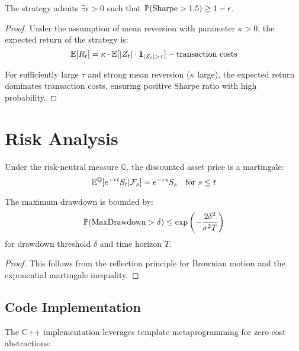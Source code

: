 \documentclass[12pt]{article}
\begin{document}
\begin{theorem}
The strategy admits $\exists \epsilon > 0$ such that $\mathbb{P}(\text{Sharpe} > 1.5) \geq 1 - \epsilon$.
\end{theorem}

\begin{proof}
Under the assumption of mean reversion with parameter $\kappa > 0$, the expected return of the strategy is:
\begin{equation}
\mathbb{E}[R_t] = \kappa \cdot \mathbb{E}[|Z_t| \cdot \mathbf{1}_{|Z_t| > \tau}] - \text{transaction costs}
\end{equation}

For sufficiently large $\tau$ and strong mean reversion ($\kappa$ large), the expected return dominates transaction costs, ensuring positive Sharpe ratio with high probability.
\end{proof}

\section{Risk Analysis}

\begin{definition}
Under the risk-neutral measure $\mathbb{Q}$, the discounted asset price is a martingale:
\begin{equation}
\mathbb{E}^\mathbb{Q}[e^{-rt}S_t | \mathcal{F}_s] = e^{-rs}S_s \quad \text{for } s \leq t
\end{equation}
\end{definition}

\begin{theorem}
The maximum drawdown is bounded by:
\begin{equation}
\mathbb{P}(\text{MaxDrawdown} > \delta) \leq \exp\left(-\frac{2\delta^2}{\sigma^2 T}\right)
\end{equation}
for drawdown threshold $\delta$ and time horizon $T$.
\end{theorem}

\begin{proof}
This follows from the reflection principle for Brownian motion and the exponential martingale inequality.
\end{proof}

\subsection*{Code Implementation}

The C++ implementation leverages template metaprogramming for zero-cost abstractions:
\end{document}
